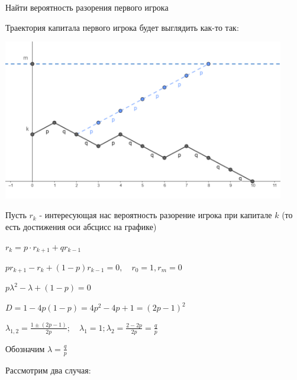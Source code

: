 \documentclass[12pt]{article}
\begin{document}
    Найти вероятность разорения первого игрока

    Траектория капитала первого игрока будет выглядить как-то так:

    \begin{center}
        \includegraphics[height=7cm]{probtheory/images/probtheory_2024_10_15_1}
    \end{center}

    Пусть $r_k$ - интересующая нас вероятность разорение игрока при капитале $k$ (то есть достижения оси абсцисс на графике)

    $r_k = p \cdot r_{k + 1} + q r_{k - 1}$

    $pr_{k + 1} - r_k + (1 - p) r_{k - 1} = 0, \quad r_0 = 1, r_{m} = 0$

    $p\lambda^2 - \lambda + (1 - p) = 0$

    $D = 1 - 4p(1 - p) = 4p^2 - 4p + 1 = (2p - 1)^2$

    $\lambda_{1, 2} = \frac{1 \pm (2p - 1)}{2p}; \quad \lambda_1 = 1; \lambda_2 = \frac{2 - 2p}{2p} = \frac{q}{p}$

    Обозначим $\lambda = \frac{q}{p}$

    Рассмотрим два случая: 
\end{document}
